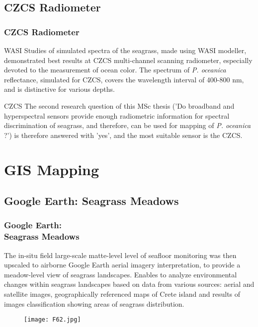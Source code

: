 \documentclass[pdflatex,compress,9pt,
	xcolor={dvipsnames,dvipsnames,svgnames,x11names,table},
	hyperref={colorlinks = true,breaklinks = true, urlcolor = NavyBlue, breaklinks = true}]{beamer}
\begin{document}
\subsection{CZCS Radiometer}
\begin{frame}\frametitle{CZCS Radiometer}

\begin{alertblock}{WASI}
Studies of simulated spectra of the seagrass, made using WASI modeller, demonstrated best results at \ac{CZCS} multi-channel scanning radiometer, especially devoted to the measurement of ocean color. The spectrum of \emph{P. oceanica} reflectance, simulated for \ac{CZCS}, covers the wavelength interval of 400-800 nm, and is distinctive for various depths.
\end{alertblock}

\begin{block}{CZCS}
The second research question of this MSc thesis ('Do broadband and hyperspectral sensors provide enough radiometric information for spectral discrimination of seagrass, and therefore, can be used for mapping of \emph{P. oceanica} ?') is therefore answered with 'yes', and the most suitable sensor is the \ac{CZCS}.
\end{block}

\end{frame}

\section{GIS Mapping}

\subsection{Google Earth: Seagrass Meadows}
\begin{frame}\frametitle{Google Earth: \\Seagrass Meadows}
\footnotesize{The in-situ field large-scale matte-level level of seafloor monitoring was then upscaled to airborne Google Earth aerial imagery interpretation, to provide a meadow-level view of seagrass landscapes. Enables to analyze environmental changes within seagrass landscapes based on data from various sources: aerial and satellite images, geographically referenced maps of Crete island and results of images classification showing areas of seagrass distribution.}
\begin{figure}[H]
	\centering
		\texttt{[image: F62.jpg]}
\end{figure}
\end{frame}
\end{document}
